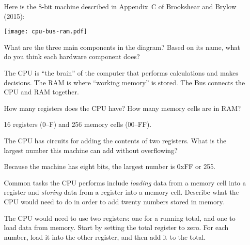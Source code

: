
Here is the 8-bit machine described in Appendix~C of Brookshear and Brylow (2015):

\begin{center}
\texttt{[image: cpu-bus-ram.pdf]}
\end{center}




\Q What are the three main components in the diagram?
Based on its name, what do you think each hardware component does?

\begin{answer}
The CPU is ``the brain'' of the computer that performs calculations and makes decisions.
The RAM is where ``working memory'' is stored.
The Bus connects the CPU and RAM together.
\end{answer}


\Q How many registers does the CPU have? How many memory cells are in RAM?

\begin{answer}[3em]
16 registers (0--F) and 256 memory cells (00--FF).
\end{answer}


\Q The CPU has circuits for adding the contents of two registers.
What is the largest number this machine can add without overflowing?

\begin{answer}
Because the machine has eight bits, the largest number is 0xFF or 255.
\end{answer}


\Q Common tasks the CPU performs include \emph{loading} data from a memory cell into a register and \emph{storing} data from a register into a memory cell.
Describe what the CPU would need to do in order to add twenty numbers stored in memory.

\begin{answer}[7em]
The CPU would need to use two registers: one for a running total, and one to load data from memory.
Start by setting the total register to zero.
For each number, load it into the other register, and then add it to the total.
\end{answer}
